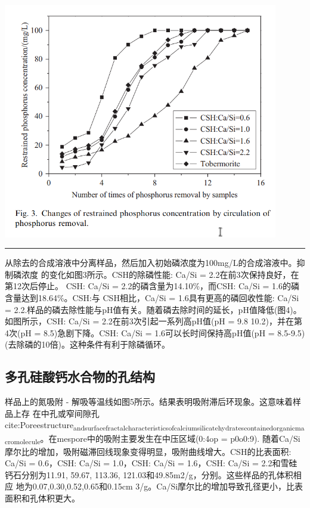 \documentclass[11pt]{article}
\begin{document}
\includegraphics[width=0.9\textwidth]{fig.3.png}
 \label{tab:title}

\noindent\rule{\textwidth}{0.5pt}



\setlength{\parindent}{1.0cm}
从除去的合成溶液中分离样品，然后加入初始磷浓度为100mg/L的合成溶液中。抑制磷浓度
的变化如图3所示。CSH的除磷性能: Ca/Si = 2.2在前3次保持良好，在第12次后停止。
CSH: Ca/Si = 2.2的磷含量为14.10\%，而CSH: Ca/Si = 1.6的磷含量达到18.64\%。CSH:与
CSH相比，Ca/Si = 1.6具有更高的磷回收性能: Ca/Si = 2.2.样品的磷去除性能与pH值有关。随着磷去除时间的延长，pH值降低(图4)。如图所示，CSH: Ca/Si = 2.2在前3次引起一系列高pH值(pH = 9.8 10.2)，并在第4次(pH = 8.5)急剧下降。CSH: Ca/Si = 1.6可以长时间保持高pH值(pH = 8.5-9.5)(去除磷的10倍)。这种条件有利于除磷循环。
\par

\subsection{多孔硅酸钙水合物的孔结构}
\label{sec:orgce8d57f}
\setlength{\parindent}{1.0cm}
样品上的氮吸附 - 解吸等温线如图5所示。结果表明吸附滞后环现象。这意味着样品上存
在中孔或窄间隙孔cite:Poreestructure\textsubscript{and}\textsubscript{surface}\textsubscript{fractal}\textsubscript{characteristics}\textsubscript{of}\textsubscript{calcium}\textsubscript{silicate}\textsubscript{hydrates}\textsubscript{contained}\textsubscript{organic}\textsubscript{macromolecule}。在mespore中的吸附主要发生在中压区域(0:4op = p0o0:9).
随着Ca/Si摩尔比的增加，吸附磁滞回线现象变得明显，吸附曲线增大。CSH的比表面积:
Ca/Si = 0.6，CSH: Ca/Si = 1.0，CSH: Ca/Si = 1.6，CSH: Ca/Si = 2.2和雪硅
钙石分别为11.91, 59.67, 113.36, 121.03和49.85m2/g，分别。这些样品的孔体积相应
地为0.07,0.30,0.52,0.65和0.15cm 3/g。Ca/Si摩尔比的增加导致孔径更小，比表面积和孔体积更大。
\par
\end{document}
